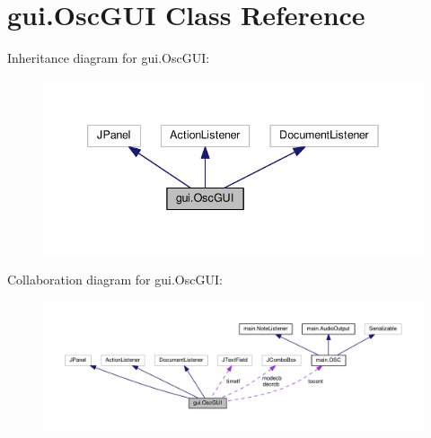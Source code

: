 \hypertarget{classgui_1_1_osc_g_u_i}{}\section{gui.\+Osc\+G\+UI Class Reference}
\label{classgui_1_1_osc_g_u_i}


Inheritance diagram for gui.\+Osc\+G\+UI\+:
\nopagebreak
\begin{figure}[H]
\begin{center}
\leavevmode
\includegraphics[width=339pt]{classgui_1_1_osc_g_u_i__inherit__graph}
\end{center}
\end{figure}


Collaboration diagram for gui.\+Osc\+G\+UI\+:
\nopagebreak
\begin{figure}[H]
\begin{center}
\leavevmode
\includegraphics[width=350pt]{classgui_1_1_osc_g_u_i__coll__graph}
\end{center}
\end{figure}

